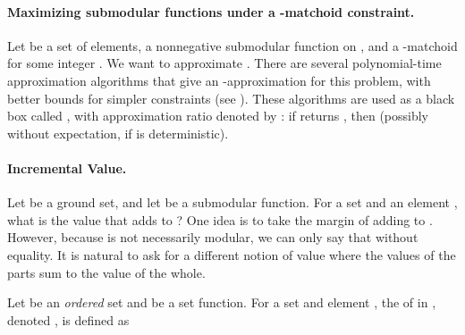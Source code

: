 \documentclass[oneside,letterpaper]{scrartcl} \usepackage{macros}
\begin{document}
\paragraph{Maximizing submodular functions under a -matchoid
  constraint.}


Let  be a set of elements,  a nonnegative submodular function on , and
 a -matchoid for some integer . We want to approximate .
There are several polynomial-time approximation algorithms that give
an -approximation for this problem, with better bounds
for simpler constraints (see ).
These algorithms are used as a black box called ,
with approximation ratio denoted by : if 
returns , then 
(possibly without expectation, if  is deterministic).





\paragraph{Incremental Value.}

\newcommand{\incvalue}{\nu}
\newcommand{\incrementalvalueof}[3]{\incvalue\parof{#1,#2,#3}}
\newcommand{\incvalueof}{\incrementalvalueof}


Let  be a ground set, and let  be a submodular function. For a set  and an element , what is the value that  adds
to ? One idea is to take the margin  of adding  to . However, because  is not necessarily
modular, we can only say that 
without equality. It is natural to ask for a different notion of value
where the values of the parts sum to the value of the whole.

Let  be an \emph{ordered} set and  be a set function.  For a set  and element , the
 of  in , denoted
, is defined as
\end{document}
